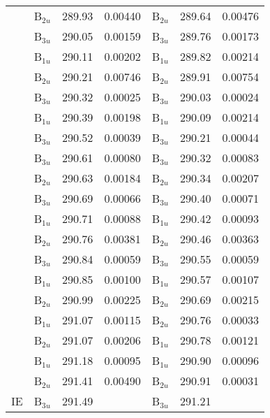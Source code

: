 \documentclass[journal=jctcce,manuscript=article]{achemso}
\begin{document}
\begin{table}
\begin{tabular}{l|lcc|lcc}
& B$_{2u}$ & 289.93 & 0.00440    & B$_{2u}$ & 289.64 & 0.00476 \\
& B$_{3u}$ & 290.05 & 0.00159    & B$_{3u}$ & 289.76 & 0.00173 \\
& B$_{1u}$ & 290.11 & 0.00202    & B$_{1u}$ & 289.82 & 0.00214 \\
& B$_{2u}$ & 290.21 & 0.00746    & B$_{2u}$ & 289.91 & 0.00754 \\
& B$_{3u}$ & 290.32 & 0.00025    & B$_{3u}$ & 290.03 & 0.00024 \\
& B$_{1u}$ & 290.39 & 0.00198    & B$_{1u}$ & 290.09 & 0.00214 \\
& B$_{3u}$ & 290.52 & 0.00039    & B$_{3u}$ & 290.21 & 0.00044 \\
& B$_{3u}$ & 290.61 & 0.00080    & B$_{3u}$ & 290.32 & 0.00083 \\
& B$_{2u}$ & 290.63 & 0.00184    & B$_{2u}$ & 290.34 & 0.00207 \\
& B$_{3u}$ & 290.69 & 0.00066    & B$_{3u}$ & 290.40 & 0.00071 \\
& B$_{1u}$ & 290.71 & 0.00088    & B$_{1u}$ & 290.42 & 0.00093 \\
& B$_{2u}$ & 290.76 & 0.00381    & B$_{2u}$ & 290.46 & 0.00363 \\
& B$_{3u}$ & 290.84 & 0.00059    & B$_{3u}$ & 290.55 & 0.00059 \\
& B$_{1u}$ & 290.85 & 0.00100    & B$_{1u}$ & 290.57 & 0.00107 \\
& B$_{2u}$ & 290.99 & 0.00225    & B$_{2u}$ & 290.69 & 0.00215 \\
& B$_{1u}$ & 291.07 & 0.00115    & B$_{2u}$ & 290.76 & 0.00033 \\
& B$_{2u}$ & 291.07 & 0.00206    & B$_{1u}$ & 290.78 & 0.00121 \\
& B$_{1u}$ & 291.18 & 0.00095    & B$_{1u}$ & 290.90 & 0.00096 \\
& B$_{2u}$ & 291.41 & 0.00490    & B$_{2u}$ & 290.91 & 0.00031 \\
\hline
IE & B$_{3u}$ & 291.49&              & B$_{3u}$ & 291.21&  \\
\hline
\end{tabular}
\end{table}
\end{document}
